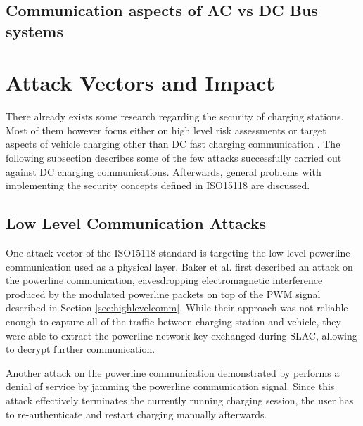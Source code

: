 \documentclass[conference,flushend]{iaria} %
\begin{document}
\subsection{Communication aspects of AC vs DC Bus systems}

\fi


\section{Attack Vectors and Impact} \label{sec:attackvectors}
There already exists some research regarding the security of charging stations. Most of them however focus either on high level risk assessments \cite{acharya_cybersecurity_2020, sanghvi_cybersecurity_2021, assi_ensuring_2023, mahrukh_load_2023, park_potential_2019, ahalawat_security_2022, bao_threat_2018} or target aspects of vehicle charging other than DC fast charging communication \cite{nasr_chargeprint_2023, sarieddine_investigating_2023, nasr_large-scale_nodate, nasr_power_2022}.
The following subsection describes some of the few attacks successfully carried out against DC charging communications.
Afterwards, general problems with implementing the security concepts defined in ISO15118 are discussed.

\subsection{Low Level Communication Attacks}
One attack vector of the ISO15118 standard is targeting the low level powerline communication used as a physical layer.
Baker et al. \cite{baker_losing_2019} first described an attack on the powerline communication, eavesdropping electromagnetic interference produced by the modulated powerline packets on top of the PWM signal described in Section \ref{sec:highlevelcomm}.
While their approach was not reliable enough to capture all of the traffic between charging station and vehicle, they were able to extract the powerline network key exchanged during SLAC, allowing to decrypt further communication.

Another attack on the powerline communication demonstrated by \cite{kohler_brokenwire_2023} performs a denial of service by jamming the powerline communication signal.
Since this attack effectively terminates the currently running charging session, the user has to re-authenticate and restart charging manually afterwards.
\end{document}
